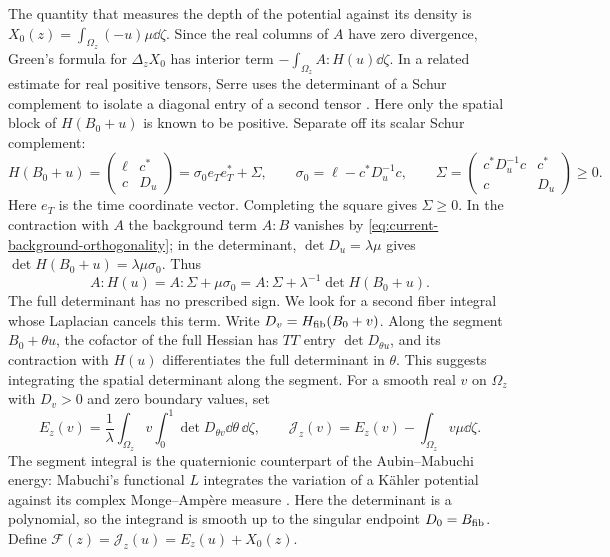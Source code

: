 The quantity that measures the depth of the potential against its
density is $X_0(z)=\int_{\Omega_z}(-u)\mu\dd\zeta$. Since the real
columns of $A$ have zero divergence, Green's formula for $\Delta_z X_0$
has interior term $-\int_{\Omega_z}A:H(u)\dd\zeta$. In a related
estimate for real positive tensors, Serre uses the determinant of a
Schur complement to isolate a diagonal entry of a second tensor
\cite[Proposition~2.2]{Serre2023Mixed}. Here only the spatial block of
$H(B_0+u)$ is known to be positive. Separate off its scalar Schur
complement:
\begin{equation}\label{eq:energy-schur}
 H(B_0+u)=
   \begin{pmatrix}\ell&c^*\\ c&D_u\end{pmatrix}
   =\sigma_0 e_Te_T^*+\Sigma,\qquad
 \sigma_0=\ell-c^*D_u^{-1}c,\qquad
 \Sigma=\begin{pmatrix}c^*D_u^{-1}c&c^*\\ c&D_u\end{pmatrix}\ge0 .
\end{equation}
Here $e_T$ is the time coordinate vector. Completing the square gives
$\Sigma\ge0$. In the contraction with $A$ the background term $A:B$
vanishes by \eqref{eq:current-background-orthogonality}; in the
determinant, $\det D_u=\lambda\mu$ gives
$\det H(B_0+u)=\lambda\mu\sigma_0$. Thus
\begin{equation}\label{eq:schur-energy-identity}
 A:H(u)=A:\Sigma+\mu\sigma_0
        =A:\Sigma+\lambda^{-1}\det H(B_0+u).
\end{equation}
The full determinant has no prescribed sign. We look for a second
fiber integral whose Laplacian cancels this term. Write
$D_v=H_{\rm fib}(B_0+v)$. Along the segment $B_0+\theta u$, the
cofactor of the full Hessian has $TT$ entry $\det D_{\theta u}$, and
its contraction with $H(u)$ differentiates the full determinant in
$\theta$. This suggests integrating the spatial determinant along the
segment. For a smooth real $v$ on $\Omega_z$ with $D_v>0$ and zero
boundary values, set
\begin{equation}\label{eq:energy-functional}
 E_z(v)=\frac1\lambda\int_{\Omega_z}v
            \int_0^1\det D_{\theta v}\dd\theta\,\dd\zeta,\qquad
 \mathcal J_z(v)=E_z(v)-\int_{\Omega_z}v\mu\dd\zeta .
\end{equation}
The segment integral is the quaternionic counterpart of the
Aubin--Mabuchi energy: Mabuchi's functional $L$ integrates the variation
of a Kähler potential against its complex Monge--Ampère measure
\cite[(2.2.1)]{Mabuchi1986}. Here the determinant is a polynomial,
so the integrand is smooth up to the singular endpoint $D_0=B_{\rm fib}$.
Define $\mathcal F(z)=\mathcal J_z(u)=E_z(u)+X_0(z)$.

